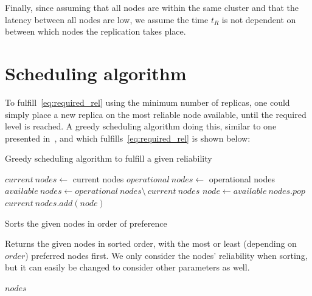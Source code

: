 \documentclass{cslthse-msc}
\begin{document}
Finally, since assuming that all nodes are within the same cluster and that the latency between all nodes are low, we assume the time $t_R$ is not dependent on between which nodes the replication takes place. 

\section{Scheduling algorithm} \label{sec:design_sched_alg}
To fulfill~\cref{eq:required_rel} using the minimum number of replicas, one could simply place a new replica on the most reliable node available, until the required level is reached. A greedy scheduling algorithm doing this, similar to one presented in~\cite{effTaskReplMobGrid}, and which fulfills~\cref{eq:required_rel} is shown below:

\begin{algorithm}[H]
	\caption{Greedy scheduling algorithm to fulfill a given reliability} \label{alg:scheduling}
	\begin{algorithmic}[1]
	\Statex
	\State $current\ nodes\gets$ current nodes
	\State $operational\ nodes\gets $ operational nodes
	\State $available\ nodes\gets operational\ nodes \setminus \ current\ nodes$
	\State
		\State $node\gets available\ nodes.pop$
		\State
		\State $current\ nodes.add(node)$
	\EndWhile
	\EndProcedure
	\end{algorithmic}
\end{algorithm} 

\begin{function} 
	\caption{Sorts the given nodes in order of preference} \label{func:sort}
	Returns the given nodes in sorted order, with the most or least (depending on $order$) preferred nodes first. We only consider the nodes' reliability when sorting, but it can easily be changed to consider other parameters as well.
	\begin{algorithmic}[1]
	\Statex
		\State
	    \State \Return $nodes$
	\EndFunction
	\end{algorithmic}
\end{function}
\end{document}
